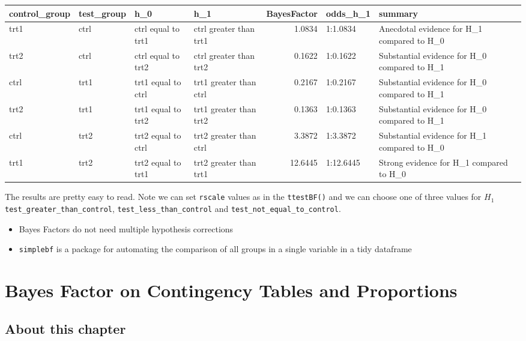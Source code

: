 \documentclass[
]{book}
\providecommand{\tightlist}{%
  \setlength{\itemsep}{0pt}\setlength{\parskip}{0pt}}
\newenvironment{roundup}
{ \begin{tcolorbox}[colbacktitle=yellow!50!white,
title=Round Up,coltitle=black,
fonttitle=\bfseries] }
{  \end{tcolorbox} }
\begin{document}
\begin{tabular}{l|l|l|l|r|l|l}
\hline
control\_group & test\_group & h\_0 & h\_1 & BayesFactor & odds\_h\_1 & summary\\
\hline
trt1 & ctrl & ctrl equal to trt1 & ctrl greater than trt1 & 1.0834 & 1:1.0834 & Anecdotal evidence for H\_1 compared to H\_0\\
\hline
trt2 & ctrl & ctrl equal to trt2 & ctrl greater than trt2 & 0.1622 & 1:0.1622 & Substantial evidence for H\_0 compared to H\_1\\
\hline
ctrl & trt1 & trt1 equal to ctrl & trt1 greater than ctrl & 0.2167 & 1:0.2167 & Substantial evidence for H\_0 compared to H\_1\\
\hline
trt2 & trt1 & trt1 equal to trt2 & trt1 greater than trt2 & 0.1363 & 1:0.1363 & Substantial evidence for H\_0 compared to H\_1\\
\hline
ctrl & trt2 & trt2 equal to ctrl & trt2 greater than ctrl & 3.3872 & 1:3.3872 & Substantial evidence for H\_1 compared to H\_0\\
\hline
trt1 & trt2 & trt2 equal to trt1 & trt2 greater than trt1 & 12.6445 & 1:12.6445 & Strong evidence for H\_1 compared to H\_0\\
\hline
\end{tabular}

The results are pretty easy to read. Note we can set \texttt{rscale} values as in the \texttt{ttestBF()} and we can choose one of three values for \(H_1\) \texttt{test\_greater\_than\_control}, \texttt{test\_less\_than\_control} and \texttt{test\_not\_equal\_to\_control}.

\begin{roundup}
\begin{itemize}
\tightlist
\item
  Bayes Factors do not need multiple hypothesis corrections
\item
  \texttt{simplebf} is a package for automating the comparison of all groups in a single variable in a tidy dataframe
\end{itemize}
\end{roundup}

\hypertarget{bayes-factor-on-contingency-tables-and-proportions}{%
\chapter{Bayes Factor on Contingency Tables and Proportions}\label{bayes-factor-on-contingency-tables-and-proportions}}

\hypertarget{about-this-chapter-4}{%
\section{About this chapter}\label{about-this-chapter-4}}
\end{document}
